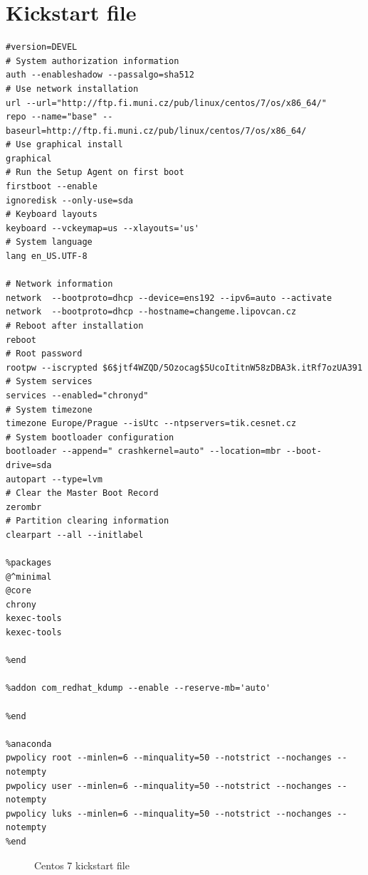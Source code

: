 \documentclass[
  printed, %
  table,   %
  nolof,     %
  nolot,     %
           oneside, color
]{fithesis3}
\begin{document}
\section{Kickstart file}
\label{kickstart}
\begin{lstlisting}
#version=DEVEL
# System authorization information
auth --enableshadow --passalgo=sha512
# Use network installation
url --url="http://ftp.fi.muni.cz/pub/linux/centos/7/os/x86_64/"
repo --name="base" --baseurl=http://ftp.fi.muni.cz/pub/linux/centos/7/os/x86_64/
# Use graphical install
graphical
# Run the Setup Agent on first boot
firstboot --enable
ignoredisk --only-use=sda
# Keyboard layouts
keyboard --vckeymap=us --xlayouts='us'
# System language
lang en_US.UTF-8

# Network information
network  --bootproto=dhcp --device=ens192 --ipv6=auto --activate
network  --bootproto=dhcp --hostname=changeme.lipovcan.cz
# Reboot after installation
reboot
# Root password
rootpw --iscrypted $6$jtf4WZQD/5Ozocag$5UcoItitnW58zDBA3k.itRf7ozUA391
# System services
services --enabled="chronyd"
# System timezone
timezone Europe/Prague --isUtc --ntpservers=tik.cesnet.cz
# System bootloader configuration
bootloader --append=" crashkernel=auto" --location=mbr --boot-drive=sda
autopart --type=lvm
# Clear the Master Boot Record
zerombr
# Partition clearing information
clearpart --all --initlabel

%packages
@^minimal
@core
chrony
kexec-tools
kexec-tools

%end

%addon com_redhat_kdump --enable --reserve-mb='auto'

%end

%anaconda
pwpolicy root --minlen=6 --minquality=50 --notstrict --nochanges --notempty
pwpolicy user --minlen=6 --minquality=50 --notstrict --nochanges --notempty
pwpolicy luks --minlen=6 --minquality=50 --notstrict --nochanges --notempty
%end
\end{lstlisting}

\begin{figure}[H]
\center
\caption{Centos 7 kickstart file}
\label{fig:kickstart}
\end{figure}

\end{document}
